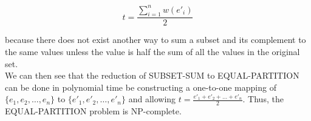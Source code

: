 \documentclass[]{report}
\begin{document}
\begin{enumerate}
   $$t = \dfrac{\sum_{i=1}^{n}w(e'_{i})}{2}$$
   
   because there does not exist another way to sum a subset and its complement to the same values unless the value is half the sum of all the values in the original set. \\
   
   We can then see that the reduction of SUBSET-SUM to EQUAL-PARTITION can be done in polynomial time be constructing a one-to-one mapping of $\{ e_1, e_2, \dots, e_n  \}$ to	$\{ e'_1, e'_2, \dots, e'_n  \}$ and allowing $ t = \frac{e'_1 + e'_2 + \dots + e'_n}{2}$. Thus, the EQUAL-PARTITION problem is NP-complete. 
	
	
		
	
\end{enumerate}
\end{document}
